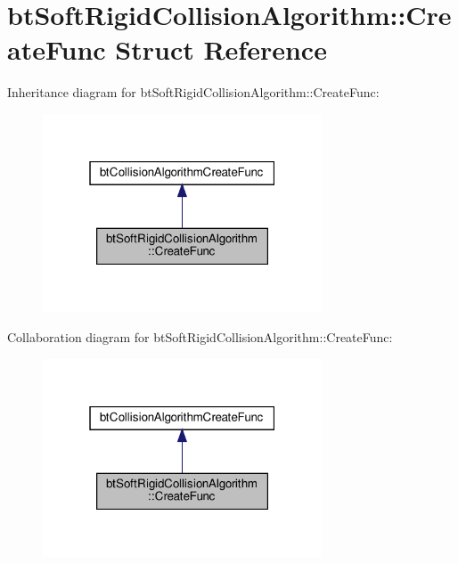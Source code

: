 \hypertarget{structbtSoftRigidCollisionAlgorithm_1_1CreateFunc}{}\section{bt\+Soft\+Rigid\+Collision\+Algorithm\+:\+:Create\+Func Struct Reference}
\label{structbtSoftRigidCollisionAlgorithm_1_1CreateFunc}


Inheritance diagram for bt\+Soft\+Rigid\+Collision\+Algorithm\+:\+:Create\+Func\+:
\nopagebreak
\begin{figure}[H]
\begin{center}
\leavevmode
\includegraphics[width=235pt]{structbtSoftRigidCollisionAlgorithm_1_1CreateFunc__inherit__graph}
\end{center}
\end{figure}


Collaboration diagram for bt\+Soft\+Rigid\+Collision\+Algorithm\+:\+:Create\+Func\+:
\nopagebreak
\begin{figure}[H]
\begin{center}
\leavevmode
\includegraphics[width=235pt]{structbtSoftRigidCollisionAlgorithm_1_1CreateFunc__coll__graph}
\end{center}
\end{figure}
